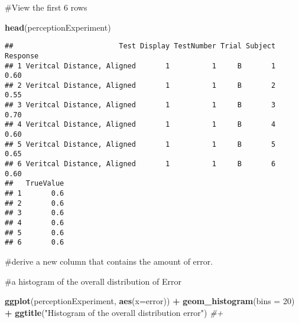 \documentclass[
]{article}
\newenvironment{Shaded}{\begin{snugshade}}{\end{snugshade}}
\newcommand{\CommentTok}[1]{\textcolor[rgb]{0.56,0.35,0.01}{\textit{#1}}}
\newcommand{\DataTypeTok}[1]{\textcolor[rgb]{0.13,0.29,0.53}{#1}}
\newcommand{\DecValTok}[1]{\textcolor[rgb]{0.00,0.00,0.81}{#1}}
\newcommand{\KeywordTok}[1]{\textcolor[rgb]{0.13,0.29,0.53}{\textbf{#1}}}
\newcommand{\NormalTok}[1]{#1}
\newcommand{\OperatorTok}[1]{\textcolor[rgb]{0.81,0.36,0.00}{\textbf{#1}}}
\newcommand{\StringTok}[1]{\textcolor[rgb]{0.31,0.60,0.02}{#1}}
\begin{document}
\#View the first 6 rows

\begin{Shaded}
\begin{Highlighting}[]
\KeywordTok{head}\NormalTok{(perceptionExperiment)}
\end{Highlighting}
\end{Shaded}

\begin{verbatim}
##                         Test Display TestNumber Trial Subject Response
## 1 Veritcal Distance, Aligned       1          1     B       1     0.60
## 2 Veritcal Distance, Aligned       1          1     B       2     0.55
## 3 Veritcal Distance, Aligned       1          1     B       3     0.70
## 4 Veritcal Distance, Aligned       1          1     B       4     0.60
## 5 Veritcal Distance, Aligned       1          1     B       5     0.65
## 6 Veritcal Distance, Aligned       1          1     B       6     0.60
##   TrueValue
## 1       0.6
## 2       0.6
## 3       0.6
## 4       0.6
## 5       0.6
## 6       0.6
\end{verbatim}

\#derive a new column that contains the amount of error.

\begin{Shaded}
\end{Shaded}

\#a histogram of the overall distribution of Error

\begin{Shaded}
\begin{Highlighting}[]
\KeywordTok{ggplot}\NormalTok{(perceptionExperiment, }\KeywordTok{aes}\NormalTok{(}\DataTypeTok{x=}\NormalTok{error)) }\OperatorTok{+}\StringTok{ }
\StringTok{  }\KeywordTok{geom_histogram}\NormalTok{(}\DataTypeTok{bins =} \DecValTok{20}\NormalTok{) }\OperatorTok{+}\StringTok{ }
\StringTok{  }\KeywordTok{ggtitle}\NormalTok{(}\StringTok{"Histogram of the overall distribution error"}\NormalTok{) }\CommentTok{#+}
\end{Highlighting}
\end{Shaded}
\end{document}
